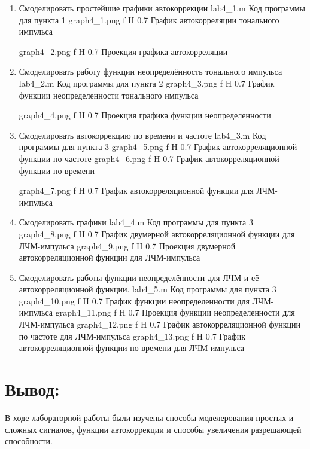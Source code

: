 \documentclass{bmstu}
\begin{document}
\begin{enumerate}

\item Смоделировать простейшие графики автокоррекции
        {lab4_1.m}
        {Код программы для пункта 1}
        {graph4_1.png}
        {f}
        {H}
        {0.7\textwidth}
        {График автокорреляции тонального импульса}

        {graph4_2.png}
        {f}
        {H}
        {0.7\textwidth}
        {Проекция графика автокорреляции}

\item Смоделировать работу функции неопределённость тонального импульса
        {lab4_2.m}
        {Код программы для пункта 2}
        {graph4_3.png}
        {f}
        {H}
        {0.7\textwidth}
        {График функции неопределенности тонального импульса}

        {graph4_4.png}
        {f}
        {H}
        {0.7\textwidth}
        {Проекция графика функции неопределенности}

\item Смоделировать автокоррекцию по времени и частоте
        {lab4_3.m}
        {Код программы для пункта 3}
        {graph4_5.png}
        {f}
        {H}
        {0.7\textwidth}
        {График автокорреляционной функции по частоте}
        {graph4_6.png}
        {f}
        {H}
        {0.7\textwidth}
        {График автокорреляционной функции по времени}

        {graph4_7.png}
        {f}
        {H}
        {0.7\textwidth}
        {График автокорреляционной функции для ЛЧМ-импульса}
\item Смоделировать графики
        {lab4_4.m}
        {Код программы для пункта 3}
        {graph4_8.png}
        {f}
        {H}
        {0.7\textwidth}
        {График двумерной автокорреляционной функции для ЛЧМ-импульса}
        {graph4_9.png}
        {f}
        {H}
        {0.7\textwidth}
        {Проекция двумерной автокорреляционной функции для ЛЧМ-импульса}

\item Смоделировать работы функции неопределённости для ЛЧМ и её автокорреляционной функции.
        {lab4_5.m}
        {Код программы для пункта 3}
        {graph4_10.png}
        {f}
        {H}
        {0.7\textwidth}
        {График функции неопределенности для ЛЧМ-импульса}
        {graph4_11.png}
        {f}
        {H}
        {0.7\textwidth}
        {Проекция функции неопределенности для ЛЧМ-импульса}
        {graph4_12.png}
        {f}
        {H}
        {0.7\textwidth}
        {График автокорреляционной функции по частоте для ЛЧМ-импульса}
        {graph4_13.png}
        {f}
        {H}
        {0.7\textwidth}
        {График автокорреляционной функции по времени для ЛЧМ-импульса}

\end{enumerate}

\chapter{Вывод:}
В ходе лабораторной работы были изучены способы моделерования простых и сложных сигналов, функции автокоррекции и способы увеличения разрешающей способности.
\end{document}

